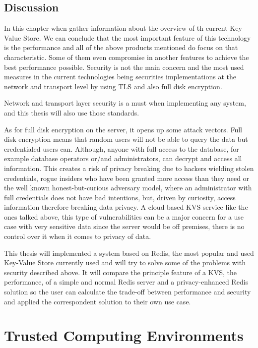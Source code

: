 \subsection{Discussion}
\label{ssec:s1_discussion}

In this chapter when gather information about the overview of th current Key-Value Store. We can conclude that the most important feature of this technology is the performance and all of the above products mentioned do focus on that characteristic. Some of them even compromise in another features to achieve the best performance possible. Security is not the main concern and the most used measures in the current technologies being securities implementations at the network and transport level by using \gls{TLS} and also full disk encryption. 

Network and transport layer security is a must when implementing any system, and this thesis will also use those standards. 

As for full disk encryption on the server, it opens up some attack vectors. Full disk encryption means that random users will not be able to query the data but credentialed users can. Although, anyone with full access to the database, for example database operators or/and administrators, can decrypt and access all information. This creates a risk of privacy breaking due to hackers wielding stolen credentials, rogue insiders who have been granted more access than they need or the well known honest-but-curious adversary model, where an administrator with full credentials does not have bad intentions, but, driven by curiosity, access information therefore breaking data privacy. A cloud based \gls{KVS} service like the ones talked above, this type of vulnerabilities can be a major concern for a use case with very sensitive data since the server would be off premises, there is no control over it when it comes to privacy of data.

This thesis will implemented a system based on Redis, the most popular and used Key-Value Store currently used and will try to solve some of the problems with security described above. It will compare the principle feature of a \gls{KVS}, the performance, of a simple and normal Redis server and a privacy-enhanced Redis solution so the user can calculate the trade-off between performance and security and applied the correspondent solution to their own use case.

\section{Trusted  Computing Environments} %
\label{sec:trusted_computing _environments}

